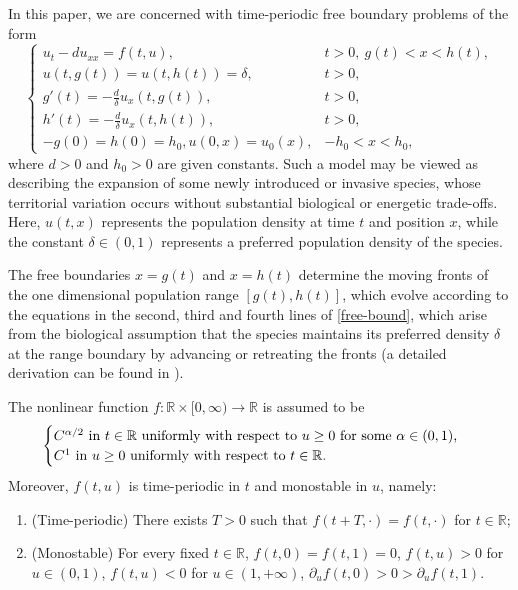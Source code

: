 \documentclass[11pt]{amsart}
\numberwithin{equation}{section}
\begin{document}
 In this paper, we are concerned with  time-periodic free boundary problems of the form 
\begin{equation}\label{free-bound}
\begin{cases}
  u_t-du_{xx}=f(t,u), &t>0,~g(t)<x<h(t),\\
  u(t,g(t))=u(t,h(t))=\delta, &t>0,\\
  g'(t)=-\frac{d}{\delta}u_x(t,g(t)),&t>0,\\
  h'(t)=-\frac{d}{\delta}u_x(t,h(t)),&t>0,\\
  -g(0)=h(0)=h_0, u(0,x)=u_0(x), &-h_0<x<h_0,
  \end{cases}
\end{equation}
where $d>0$ and $h_0>0$ are given constants.  Such a model may be viewed as describing the expansion of some newly introduced or invasive species, whose territorial variation occurs without substantial biological or energetic trade-offs.  Here, $u(t,x)$ represents the population density at time $t$ and position $x$,  while the constant $\delta \in (0,1)$ represents a preferred population density of the species. 

The free boundaries $x = g(t)$ and $x = h(t)$ determine the moving fronts of the one dimensional population range $[g(t), h(t)]$, which evolve according to the equations in the second, third and fourth lines of \eqref{free-bound},
which arise from the biological assumption that the species maintains its preferred density $\delta$ at the range boundary by advancing or retreating the fronts (a detailed derivation  can be found in \cite{D}).  

The nonlinear function \( f:\mathbb{R}\times[0,\infty)\to\mathbb{R} \) is assumed to be
\begin{equation}\label{f-smooth}
\begin{cases}\mbox{\( C^{\alpha/2} \) in \( t\in\mathbb R \) uniformly with respect to \( u\ge0 \) for some \( \alpha\in(0,1) \), }\\
\mbox{\( C^1 \) in \( u\geq 0 \) uniformly with respect to \( t\in\mathbb{R} \).}
\end{cases}
\end{equation}
   Moreover, $f(t,u)$ is time-periodic in $t$ and monostable in $u$, namely:
\begin{enumerate}
  \item[($\rm{\bf{f_p}}$):] (Time-periodic) There exists $T>0$ such that $f(t+T,\cdot)=f(t,\cdot)$ for $t\in\mathbb{R}$;
  \item[($\rm{\bf{f_m}}$):](Monostable) For every fixed $t\in\mathbb R$, $f(t, 0)=f(t,1)=0$, $f(t, u)>0 $ for $u\in(0,1)$, $f(t, u)<0 $ for $u\in(1,+\infty)$, $\partial_uf(t, 0)>0>\partial_uf(t,1)$.
  \end{enumerate}
  
\end{document}

